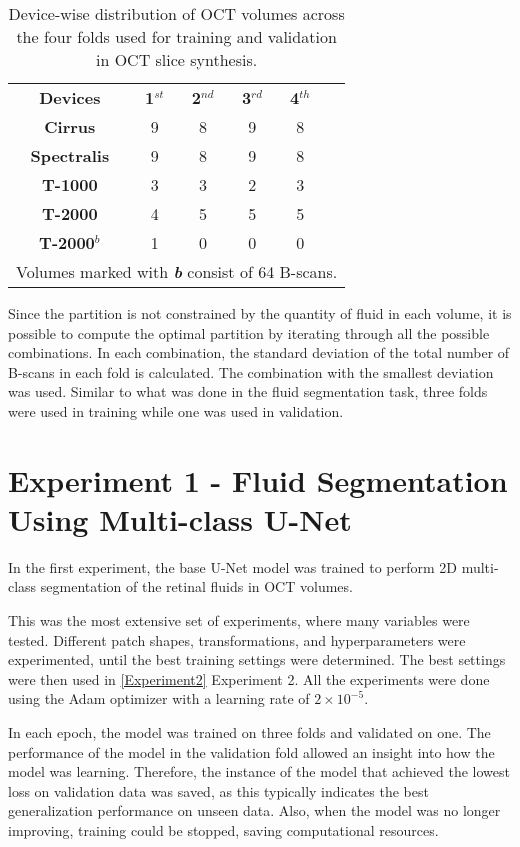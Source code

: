 \begin{table*}[!ht]
	\setlength{\tabcolsep}{6pt}
	\renewcommand{\arraystretch}{1.3}
	\caption{Device-wise distribution of OCT volumes across the four folds used for training and validation in OCT slice synthesis.}
	\centering
	\begin{tabular}{|c|c|c|c|c|c}
		\cline{1-5}
		\textbf{Devices} & \textbf{1$^{st}$} & \textbf{2$^{nd}$} & \textbf{3$^{rd}$} & \textbf{4$^{th}$} & \\
		\cline{1-5}
		\textbf{Cirrus} & 9 & 8 & 9 & 8 & \\
		\textbf{Spectralis} & 9 & 8 & 9 & 8 & \\
		\textbf{T-1000} & 3 & 3 & 2 & 3 & \\
		\textbf{T-2000} & 4 & 5 & 5 & 5 & \\
		\textbf{T-2000$^{b}$} & 1 & 0 & 0 & 0 & \\
		\cline{1-5}
		\multicolumn{6}{l}{Volumes marked with \textbf{\textit{b}} consist of 64 B-scans.} \\
	\end{tabular}
	\label{tab:FourFoldSplit}
\end{table*}
	
Since the partition is not constrained by the quantity of fluid in each volume, it is possible to compute the optimal partition by iterating through all the possible combinations. In each combination, the standard deviation of the total number of B-scans in each fold is calculated. The combination with the smallest deviation was used. Similar to what was done in the fluid segmentation task, three folds were used in training while one was used in validation.

\section{Experiment 1 - Fluid Segmentation Using Multi-class U-Net}\label{Experiment1}

In the first experiment, the base U-Net model was trained to perform 2D multi-class segmentation of the retinal fluids in OCT volumes.
\par
This was the most extensive set of experiments, where many variables were tested. Different patch shapes, transformations, and hyperparameters were experimented, until the best training settings were determined. The best settings were then used in \ref{Experiment2} Experiment 2. All the experiments were done using the Adam optimizer \parencite{Kingma2015} with a learning rate of $2 \times 10^{-5}$.
\par
In each epoch, the model was trained on three folds and validated on one. The performance of the model in the validation fold allowed an insight into how the model was learning. Therefore, the instance of the model that achieved the lowest loss on validation data was saved, as this typically indicates the best generalization performance on unseen data. Also, when the model was no longer improving, training could be stopped, saving computational resources.

